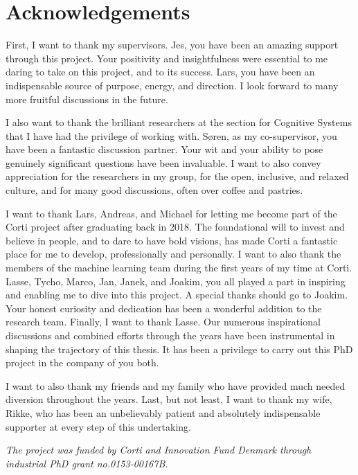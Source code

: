 
\chapter[acknowledgements]{Acknowledgements}
First, I want to thank my supervisors. Jes, you have been an amazing support through this project. 
Your positivity and insightfulness were essential to me daring to take on this project, and to its success. 
Lars, you have been an indispensable source of purpose, energy, and direction. I look forward to many more fruitful discussions in the future.

I also want to thank the brilliant researchers at the section for Cognitive Systems that I have had the privilege of working with. 
Søren, as my co-supervisor, you have been a fantastic discussion partner. Your wit and your ability to pose genuinely significant questions have been invaluable. 
I want to also convey appreciation for the researchers in my group, for the open, inclusive, and relaxed culture, and for many good discussions, often over coffee and pastries.

I want to thank Lars, Andreas, and Michael for letting me become part of the Corti project after graduating back in 2018. 
The foundational will to invest and believe in people, and to dare to have bold visions, has made Corti a fantastic place for me to develop, professionally and personally. 
I want to also thank the members of the machine learning team during the first years of my time at Corti. Lasse, Tycho, Marco, Jan, Janek, and Joakim, you all played a part in inspiring and enabling me to dive into this project. 
A special thanks should go to Joakim. Your honest curiosity and dedication has been a wonderful addition to the research team. 
Finally, I want to thank Lasse. Our numerous inspirational discussions and combined efforts through the years have been instrumental in shaping the trajectory of this thesis. It has been a privilege to carry out this PhD project in the company of you both. 

I want to also thank my friends and my family who have provided much needed diversion throughout the years. 
Last, but not least, I want to thank my wife, Rikke, who has been an unbelievably patient and absolutely indispensable supporter at every step of this undertaking.

\vspace*{\fill}
\noindent \textit{The project was funded by Corti and Innovation Fund Denmark through industrial PhD grant no.\@ 0153-00167B.}
